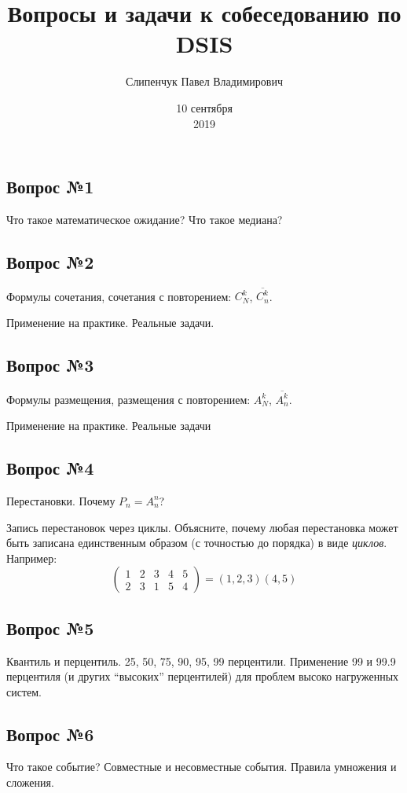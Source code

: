 \documentclass[english,russian,12pt]{article}
\title{Вопросы и задачи к собеседованию по DSIS}
\date{10 сентября \\ 2019}
\author{Слипенчук Павел Владимирович}
\begin{document}
\maketitle


\subsection*{Вопрос №1}

Что такое математическое ожидание? Что такое медиана?

\subsection*{Вопрос №2}
Формулы сочетания, сочетания с повторением: 
$C_N^k$, $\overline{C_n^k}$. 

Применение на практике. 
Реальные задачи.

\subsection*{Вопрос №3}
Формулы размещения, размещения с повторением: 
$A_N^k$, $\overline{A_n^k}$.

Применение на практике. Реальные задачи

\subsection*{Вопрос №4}
Перестановки. 
Почему $P_n = A_n^n$?

Запись перестановок через циклы.
Объясните, почему любая перестановка может быть записана
единственным образом (с точностью до порядка)
в виде \textit{циклов}.
Например:
\begin{equation}
\left( 
	\begin{array}{ccccc}
	1 & 2 & 3 & 4 & 5 \\
	2 & 3 & 1 & 5 & 4
	\end{array}
\right) = (1, 2, 3) (4, 5)
\end{equation} 

\subsection*{Вопрос №5}
Квантиль и перцентиль.
25, 50, 75, 90, 95, 99 перцентили.
Применение 99 и 99.9 перцентиля (и других “высоких” перцентилей) для проблем высоко нагруженных систем.

\subsection*{Вопрос №6}
Что такое событие? 
Совместные и несовместные события.
Правила умножения и сложения.
\end{document}
